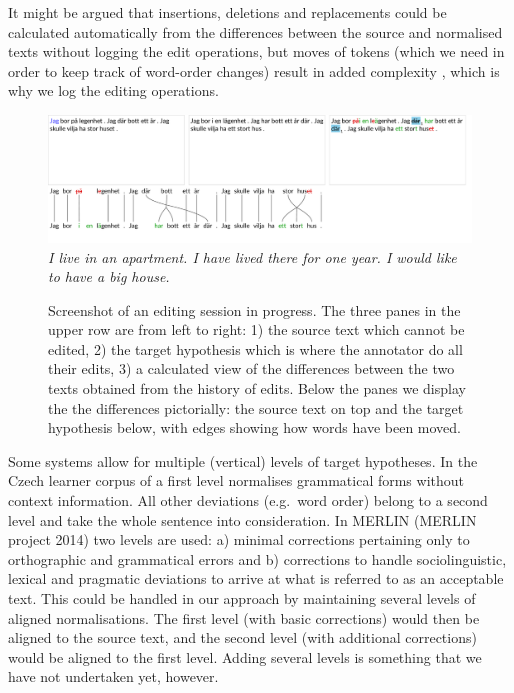 \documentclass[10pt, a4paper]{article}
\begin{document}
It might be argued that insertions, deletions and
replacements could be calculated automatically from the differences between the source and normalised texts without logging the edit operations, but moves of tokens (which we need in order to keep track of word-order changes) result in added complexity \cite{ShapiraStorer2007}, which is why we log the editing operations.

\begin{figure}
\includegraphics[width=\textwidth, trim={0 1cm 0 0}, clip]{screenshot.pdf}
\emph{\small I live in an apartment. I have lived there for one year. I would like to have a big house.}
\caption{Screenshot of an editing session in progress. The three panes in the upper row are from left to right:
1) the source text which cannot be edited,
2) the target hypothesis which is where the annotator do all their edits,
3) a calculated view of the differences between the two texts obtained from the history of edits.
Below the panes we display the the differences pictorially:
the source text on top and the target hypothesis below, with edges
showing how words have been moved.
\label{fig:screenshot}
}
\end{figure}

Some systems allow for multiple (vertical) levels of target hypotheses. In the Czech learner corpus of  a
first level normalises grammatical forms without context information. All other deviations (e.g.\ word order) belong to a second level and take the whole sentence into consideration.
In MERLIN (MERLIN project 2014) two levels are used: a) minimal corrections pertaining only to orthographic and grammatical errors and b) corrections to handle sociolinguistic, lexical and pragmatic deviations to arrive at what is referred to as an acceptable text. This could be handled in our approach by maintaining several levels of aligned normalisations. The first level (with basic corrections) would then be aligned to the source text, and the second level (with additional corrections) would be aligned to the first level. Adding several levels is something that we have not undertaken yet, however.
\end{document}
